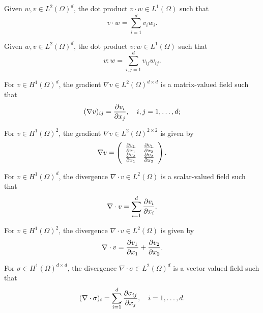 \begin{definition}
  Given $w,v \in L^2(\Omega)^d$, the dot product $v \cdot w \in L^1(\Omega)$ such that
  \begin{equation*}
    v \cdot w = \sum_{i=1}^d v_i w_i .
  \end{equation*}
\end{definition}
\begin{definition}
  Given $w,v \in L^2(\Omega)^d$, the dot product $v : w \in L^1(\Omega)$ such that
  \begin{equation*}
    v : w = \sum_{i,j=1}^d v_{ij} w_{ij} .
  \end{equation*}
\end{definition}
\begin{definition}
  For $v \in H^1(\Omega)^d$, the gradient $\nabla v \in L^2(\Omega)^{d \times d}$ is a matrix-valued field such that
\begin{equation*}
  (\nabla v)_{ij} = \pp{v_i}{x_j}, \quad i,j = 1,\dots,d;
\end{equation*}
\end{definition}
\begin{corollary}
  For $v \in H^1(\Omega)^2$, the gradient $\nabla v \in L^2(\Omega)^{2 \times 2}$ is given by
\begin{equation*}
  \nabla v = \bmat{cc}
  \pp{v_1}{x_1} & \pp{v_1}{x_2} \\
  \pp{v_2}{x_1} & \pp{v_2}{x_2}
  \emat.
\end{equation*}
\end{corollary}
\begin{definition}
For $v \in H^1(\Omega)^d$, the divergence $\nabla \cdot v \in L^2(\Omega)$ is a scalar-valued field such that
\begin{equation*}
  \nabla \cdot v = \sum_{i = 1}^d \pp{v_i}{x_i}.
\end{equation*}
\end{definition}
\begin{corollary}
  For $v \in H^1(\Omega)^2$, the divergence $\nabla \cdot v \in L^2(\Omega)$ is given by
\begin{equation*}
  \nabla \cdot v = \pp{v_1}{x_1} + \pp{v_2}{x_2}.
\end{equation*}
\end{corollary}
\begin{definition}
For $\sigma \in H^1(\Omega)^{d \times d}$, the divergence $\nabla \cdot \sigma \in L^2(\Omega)^d$ is a vector-valued field such that
\begin{equation*}
  (\nabla \cdot \sigma)_i = \sum_{i=1}^d \pp{\sigma_{ij}}{x_j}, \quad i = 1,\dots,d.
\end{equation*}
\end{definition}

